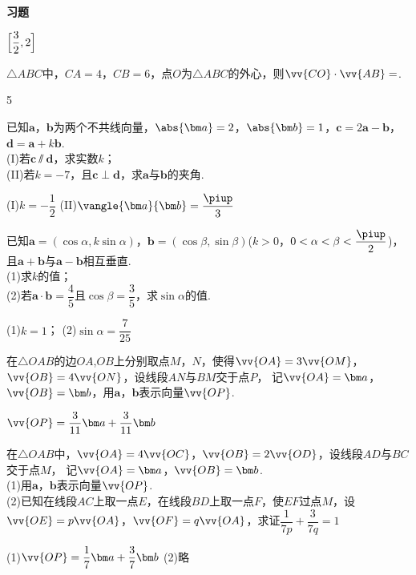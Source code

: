 \begin{exercise}{\textbf{习题}}
    \begin{answer}
      $\Bigl[\dfrac{3}2,2\Bigr]$
    \end{answer}
  \item%
    $\triangle{ABC}$中，$CA=4$，$CB=6$，点$O$为$\triangle{ABC}$的外心，则$\vv{CO}\cdot\vv{AB}=$\tk.
    \begin{answer}
      5
    \end{answer}
  \item%
    已知$\bm a$，$\bm b$为两个不共线向量，$\abs{\bm a}=2$，$\abs{\bm b}=1$，$\bm c=2\bm a-\bm b$，$\bm d=\bm a+k\bm b$.\\
    (I)若$\bm c\varparallel\bm d$，求实数$k$；\\
    (II)若$k=-7$，且$\bm c\perp\bm d$，求$\bm a$与$\bm b$的夹角.
    \begin{answer}
      (I)$k=-\dfrac12$
      (II)$\vangle{\bm a}{\bm b}=\dfrac{\piup}3$
    \end{answer}
  \vspace{3cm}
  \item%
    已知$\bm a=(\cos\alpha,k\sin\alpha)$，$\bm b=(\cos\beta,\sin\beta)$($k>0$，$0<\alpha<\beta<\dfrac{\piup}2$)，且$\bm a+\bm b$与$\bm a-\bm b$相互垂直.\\
    (1)求$k$的值；\\
    (2)若$\bm a\cdot\bm b=\dfrac45$且$\cos\beta=\dfrac35$，求$\sin\alpha$的值.
    \begin{answer}
      (1)$k=1$；
      (2)$\sin\alpha=\dfrac7{25}$
    \end{answer}
    \vspace{4cm}
  \vspace{3.5cm}
  \item%
    在$\triangle{OAB}$的边$OA$,$OB$上分别取点$M$，$N$，使得$\vv{OA}=3\vv{OM}$，$\vv{OB}=4\vv{ON}$，设线段$AN$与$BM$交于点$P$，
    记$\vv{OA}=\bm a$，$\vv{OB}=\bm b$，用$\bm a$，$\bm b$表示向量$\vv{OP}$.
    \begin{answer}
      $\vv{OP}=\dfrac3{11}\bm a+\dfrac3{11}\bm b$
    \end{answer}
  \vspace{9cm}
  \item%
    在$\triangle{OAB}$中，$\vv{OA}=4\vv{OC}$，$\vv{OB}=2\vv{OD}$，设线段$AD$与$BC$交于点$M$，
    记$\vv{OA}=\bm a$，$\vv{OB}=\bm b$.\\
    (1)用$\bm a$，$\bm b$表示向量$\vv{OP}$.\\
    (2)已知在线段$AC$上取一点$E$，在线段$BD$上取一点$F$，使$EF$过点$M$，设$\vv{OE}=p\vv{OA}$，$\vv{OF}=q\vv{OA}$，求证$\dfrac1{7p}+\dfrac3{7q}=1$
    \begin{answer}
      (1)$\vv{OP}=\dfrac17\bm a+\dfrac37\bm b$
      (2)略
    \end{answer}
  \vspace{9cm}
\end{exercise}

